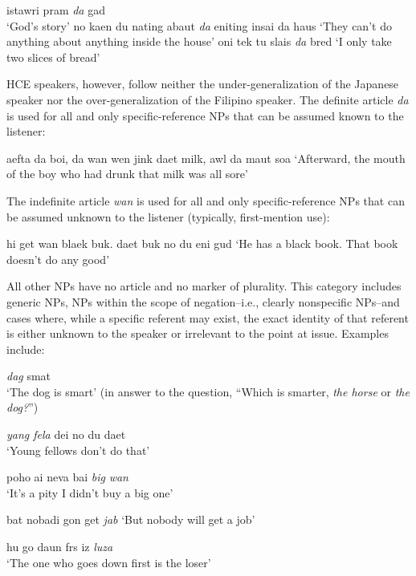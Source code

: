 \ea\label{ex:31}
 istawri pram \textit{da} gad\\
\glt   `God's story'
\z
\ea\label{ex:32}
 no kaen du nating abaut \textit{da} eniting insai da haus
\glt   `They can't do anything about anything inside the house'
\z
\ea\label{ex:33}
 oni tek tu slais \textit{da} bred
\glt `I only take two slices of bread'
\z

HCE speakers, however, follow neither the under-generalization of the Japanese speaker nor the over-generalization of the Filipino speaker. The definite article \textit{da} is used for all and only specific-refer\-ence NPs that can be assumed known to the listener:

\ea\label{ex:34}
 aefta da boi, da wan wen jink daet milk, awl da maut soa 
\glt `Afterward, the mouth of the boy who had drunk that milk was all sore'
\z

\noindent The indefinite article \textit{wan} is used for all and only specific-reference NPs that can be assumed unknown to the listener (typically, first-mention use):

\ea\label{ex:35}
 hi get wan blaek buk. daet buk no du eni gud
\glt `He has a black book. That book doesn't do any good'
\z

\noindent All other NPs have no article and no marker of plurality. This category includes generic NPs, NPs within the scope of negation--i.e., clearly nonspecific NPs--and cases where, while a specific referent may exist, the exact identity of that referent is either unknown to the speaker or irrelevant to the point at issue. Examples include:

\ea\label{ex:36}
\textit{dag} smat\\
\glt `The dog is smart' (in answer to the question, ``Which is smarter, \textit{the horse} or \textit{the dog?}'')
\z

\ea\label{ex:37}
\textit{yang fela} dei no du daet \\
\glt `Young fellows don't do that'
\z


\ea\label{ex:38}
poho ai neva bai \textit{big} \textit{wan}\\
\glt `It's a pity I didn't buy a big one'
\z

\ea\label{ex:39}
bat nobadi gon get \textit{jab}
\glt `But nobody will get a job'
\z

\ea\label{ex:40}
hu go daun frs iz \textit{luza}\\
\glt `The one who goes down first is the loser'
\z

